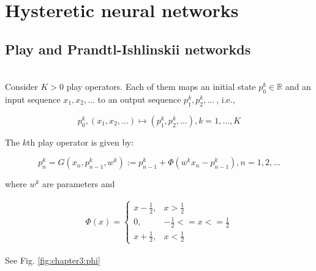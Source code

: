 

\section{Hysteretic neural networks\label{sec:chapter3:hnn}}
\subsection{Play and Prandtl-Ishlinskii networkds\label{sec:chapter3:play-and-pi-networks}}
\\
Consider $K > 0$ play operators. Each of them maps an initial state $p_{0}^{k} \in \mathbb{R} $ and an input sequence $x_1, x_2, \ldots$ to an output sequence $p_{1}^{k}, p_{2}^{k}, \ldots \ $, i.e.,

\begin{equation*}
  p_{0}^{k}, (x_1, x_2, \ldots) \mapsto (p_{1}^{k}, p_{2}^{k}, \ldots), k = 1, \ldots, K
\end{equation*}

The $k$th play operator is given by:

\begin{equation}\label{\eqn:chapter3:play-operator}
  p_{n}^{k} = G(x_{n}, p_{n-1}^{k}, w^{k}) := p_{n-1}^{k} + \Phi(w^{k} x_{n} - p_{n-1}^{k}), n = 1, 2, \ldots
\end{equation}

where $w^{k}$ are parameters and

\begin{equation}\label{\eqn:chapter3:phi}
  \begin{aligned*}
    \Phi(x) =
    \begin{cases}
      x - \frac{1}{2}, & x > \frac{1}{2} \\
      0,               & -\frac{1}{2} <= x <= \frac{1}{2} \\
      x + \frac{1}{2}, & x < \frac{1}{2}
    \end{cases}
  \end{aligned*}
\end{equation}

See Fig. \ref{fig:chapter3:phi}

